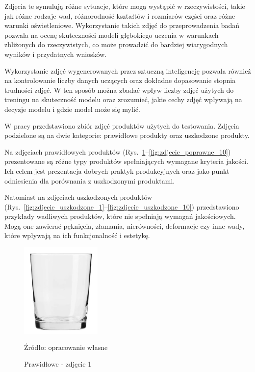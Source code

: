 Zdjęcia te symulują różne sytuacje, które mogą wystąpić w rzeczywistości, takie jak różne rodzaje wad, różnorodność kształtów i rozmiarów części oraz różne warunki oświetleniowe. Wykorzystanie takich zdjęć do przeprowadzenia badań pozwala na ocenę skuteczności modeli głębokiego uczenia w warunkach zbliżonych do rzeczywistych, co może prowadzić do bardziej wiarygodnych wyników i przydatnych wniosków.

Wykorzystanie zdjęć wygenerowanych przez sztuczną inteligencję pozwala również na kontrolowanie liczby danych uczących oraz dokładne dopasowanie stopnia trudności zdjęć. W ten sposób można zbadać wpływ liczby zdjęć użytych do treningu na skuteczność modelu oraz zrozumieć, jakie cechy zdjęć wpływają na decyzje modelu i gdzie model może się mylić.

W pracy przedstawiono zbiór zdjęć produktów użytych do testowania. Zdjęcia podzielone są na dwie kategorie: prawidłowe produkty oraz uszkodzone produkty. 

Na zdjęciach prawidłowych produktów (Rys.~\ref{fig:zdjecie_poprawne_1}--\ref{fig:zdjecie_poprawne_10}) prezentowane są różne typy produktów spełniających wymagane kryteria jakości. Ich celem jest prezentacja dobrych praktyk produkcyjnych oraz jako punkt odniesienia dla porównania z uszkodzonymi produktami.

Natomiast na zdjęciach uszkodzonych produktów (Rys.~\ref{fig:zdjecie_uszkodzone_1}--\ref{fig:zdjecie_uszkodzone_10}) przedstawiono przykłady wadliwych produktów, które nie spełniają wymagań jakościowych. Mogą one zawierać pęknięcia, złamania, nierówności, deformacje czy inne wady, które wpływają na ich funkcjonalność i estetykę.

\begin{figure}[htbp]
  \centering
  \caption{Prawidłowe - zdjęcie 1}
  \includegraphics[width=150px]{images/success_1.png}
  \begin{center}
  \footnotesize{Źródło: opracowanie własne}
  \end{center}
  \label{fig:zdjecie_poprawne_1}
\end{figure}

